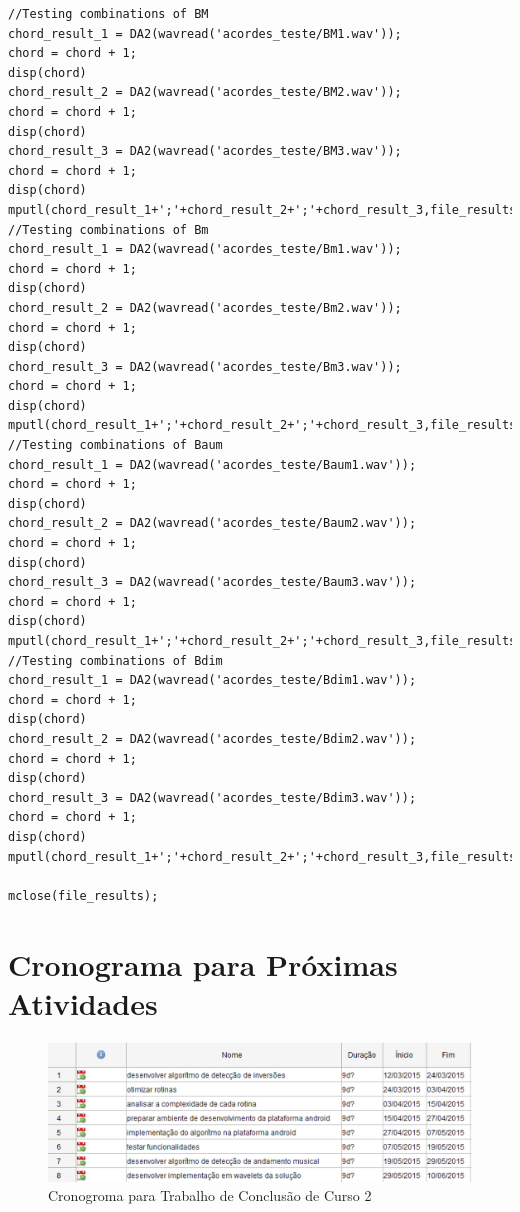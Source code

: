 \begin{apendicesenv}
\begin{lstlisting}
//Testing combinations of BM
chord_result_1 = DA2(wavread('acordes_teste/BM1.wav'));
chord = chord + 1;
disp(chord)
chord_result_2 = DA2(wavread('acordes_teste/BM2.wav'));
chord = chord + 1;
disp(chord)
chord_result_3 = DA2(wavread('acordes_teste/BM3.wav'));
chord = chord + 1;
disp(chord)
mputl(chord_result_1+';'+chord_result_2+';'+chord_result_3,file_results);
//Testing combinations of Bm
chord_result_1 = DA2(wavread('acordes_teste/Bm1.wav'));
chord = chord + 1;
disp(chord)
chord_result_2 = DA2(wavread('acordes_teste/Bm2.wav'));
chord = chord + 1;
disp(chord)
chord_result_3 = DA2(wavread('acordes_teste/Bm3.wav'));
chord = chord + 1;
disp(chord)
mputl(chord_result_1+';'+chord_result_2+';'+chord_result_3,file_results);
//Testing combinations of Baum
chord_result_1 = DA2(wavread('acordes_teste/Baum1.wav'));
chord = chord + 1;
disp(chord)
chord_result_2 = DA2(wavread('acordes_teste/Baum2.wav'));
chord = chord + 1;
disp(chord)
chord_result_3 = DA2(wavread('acordes_teste/Baum3.wav'));
chord = chord + 1;
disp(chord)
mputl(chord_result_1+';'+chord_result_2+';'+chord_result_3,file_results);
//Testing combinations of Bdim
chord_result_1 = DA2(wavread('acordes_teste/Bdim1.wav'));
chord = chord + 1;
disp(chord)
chord_result_2 = DA2(wavread('acordes_teste/Bdim2.wav'));
chord = chord + 1;
disp(chord)
chord_result_3 = DA2(wavread('acordes_teste/Bdim3.wav'));
chord = chord + 1;
disp(chord)
mputl(chord_result_1+';'+chord_result_2+';'+chord_result_3,file_results);

mclose(file_results);
\end{lstlisting}

\end{apendicesenv}

\section{Cronograma para Próximas Atividades}
\label{sec:cronograma}
\begin{figure}[h]
	\centering
		\includegraphics[keepaspectratio=true,scale=0.9]{figuras/cronograma.eps}
	\caption{Cronogroma para Trabalho de Conclusão de Curso 2}
\end{figure}